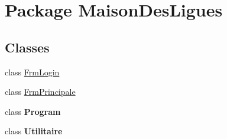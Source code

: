 \hypertarget{namespace_maison_des_ligues}{}\section{Package Maison\+Des\+Ligues}
\label{namespace_maison_des_ligues}
\subsection*{Classes}
\begin{DoxyCompactItemize}
\item 
class \hyperlink{class_maison_des_ligues_1_1_frm_login}{Frm\+Login}
\item 
class \hyperlink{class_maison_des_ligues_1_1_frm_principale}{Frm\+Principale}
\item 
class {\bfseries Program}
\item 
class {\bfseries Utilitaire}
\end{DoxyCompactItemize}
